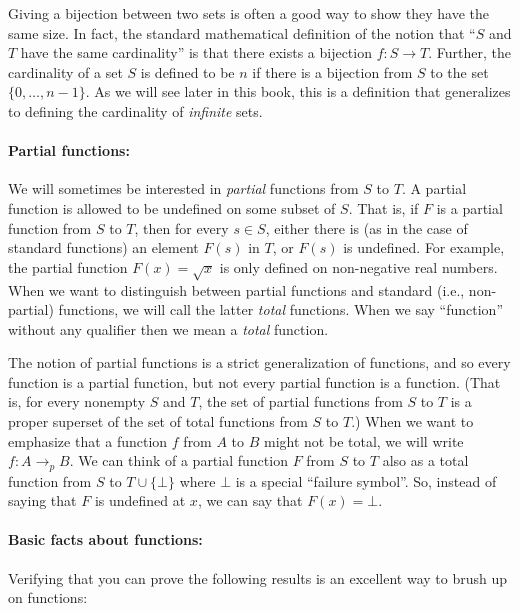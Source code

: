 Giving a bijection between two sets is often a good way to show they
have the same size. In fact, the standard mathematical definition of the
notion that ``\(S\) and \(T\) have the same cardinality'' is that there
exists a bijection \(f:S \rightarrow T\). Further, the cardinality of a
set \(S\) is defined to be \(n\) if there is a bijection from \(S\) to
the set \(\{0,\ldots,n-1\}\). As we will see later in this book, this is
a definition that generalizes to defining the cardinality of
\emph{infinite} sets.

\paragraph{Partial functions:} We will sometimes be interested in
\emph{partial} functions from \(S\) to \(T\). A partial function is
allowed to be undefined on some subset of \(S\). That is, if \(F\) is a
partial function from \(S\) to \(T\), then for every \(s\in S\), either
there is (as in the case of standard functions) an element \(F(s)\) in
\(T\), or \(F(s)\) is undefined. For example, the partial function
\(F(x)= \sqrt{x}\) is only defined on non-negative real numbers. When we
want to distinguish between partial functions and standard (i.e.,
non-partial) functions, we will call the latter \emph{total} functions.
When we say ``function'' without any qualifier then we mean a
\emph{total} function.

The notion of partial functions is a strict generalization of functions,
and so every function is a partial function, but not every partial
function is a function. (That is, for every nonempty \(S\) and \(T\),
the set of partial functions from \(S\) to \(T\) is a proper superset of
the set of total functions from \(S\) to \(T\).) When we want to
emphasize that a function \(f\) from \(A\) to \(B\) might not be total,
we will write \(f: A \rightarrow_p B\). We can think of a partial
function \(F\) from \(S\) to \(T\) also as a total function from \(S\)
to \(T \cup \{ \bot \}\) where \(\bot\) is a special ``failure symbol''.
So, instead of saying that \(F\) is undefined at \(x\), we can say that
\(F(x)=\bot\).

\paragraph{Basic facts about functions:} Verifying that you can prove
the following results is an excellent way to brush up on functions:

